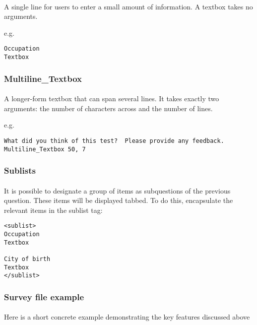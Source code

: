 \paragraph{}
A single line for users to enter a small amount of information.  A textbox takes no arguments.

e.g.

\begin{lstlisting}
Occupation
Textbox
\end{lstlisting}


\subsubsection{Multiline\_Textbox}

\paragraph{}
A longer-form textbox that can span several lines.  It takes exactly two arguments: the number of characters across and the number of lines.

e.g.

\begin{lstlisting}
What did you think of this test?  Please provide any feedback.
Multiline_Textbox 50, 7
\end{lstlisting}


\subsubsection{Sublists}

\paragraph{}
It is possible to designate a group of items as subquestions of the previous question.  These items will be displayed tabbed.  To do this, encapsulate the relevant items in the sublist tag:

\begin{lstlisting}
<sublist>
Occupation
Textbox

City of birth
Textbox
</sublist>
\end{lstlisting}


\subsubsection{Survey file example}

\paragraph{}
Here is a short concrete example demonstrating the key features discussed above

